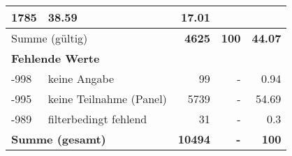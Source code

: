 \begin{longtable}{lXrrr}
       \num{1785} &
       \num[round-mode=places,round-precision=2]{38,59} &
         \num[round-mode=places,round-precision=2]{17,01} \\
     \midrule
     \multicolumn{2}{l}{Summe (gültig)} &
       \textbf{\num{4625}} &
     \textbf{100} &
       \textbf{\num[round-mode=places,round-precision=2]{44,07}} \\
     \multicolumn{5}{l}{\textbf{Fehlende Werte}}\\
       -998 &
       keine Angabe &
         \num{99} &
        - &
         \num[round-mode=places,round-precision=2]{0,94} \\
       -995 &
       keine Teilnahme (Panel) &
         \num{5739} &
        - &
         \num[round-mode=places,round-precision=2]{54,69} \\
       -989 &
       filterbedingt fehlend &
         \num{31} &
        - &
         \num[round-mode=places,round-precision=2]{0,3} \\
     \midrule
     \multicolumn{2}{l}{\textbf{Summe (gesamt)}} &
          \textbf{\num{10494}} &
        \textbf{-} &
        \textbf{100} \\
     \bottomrule
     \end{longtable}
     
